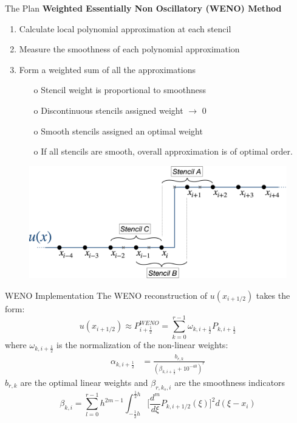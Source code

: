 \documentclass[10pt]{beamer}
\begin{document}
    \begin{frame}{The Plan}
      \textbf{Weighted Essentially Non Oscillatory (WENO) Method}
      \begin{enumerate}
        \item Calculate local polynomial approximation at each stencil
        \item Measure the smoothness of each polynomial approximation
        \item Form a weighted sum of all the approximations
            \begin{itemize}
              \item[o] Stencil weight is proportional to smoothness
              \item[o] Discontinuous stencils assigned weight $\rightarrow$ 0
              \item[o] Smooth stencils assigned an optimal weight 
              \item[o] If all stencils are smooth, overall approximation is of optimal order. 
            \end{itemize}
      \end{enumerate}


      \begin{figure}[H]
        \centering
        \includegraphics[scale=0.175]{DiscontinuousStencil.png}
        \end{figure}
    \end{frame}


\begin{frame}{WENO Implementation}
  The WENO reconstruction of $u(x_{i+1/2})$ takes the form:
  \begin{equation}
    u(x_{i+1/2})\approx P^{WENO}_{i+\frac{1}{2}}=\sum_{k=0}^{r-1}\omega_{k,i+\frac{1}{2}}P_{k,i+\frac{1}{2}}\label{eq:WenoEquation}
  \end{equation}
  where $\omega_{k,i+\frac{1}{2}}$ is the normalization of the non-linear weights:
  \begin{align}
    \alpha_{k,i+\frac{1}{2}}&=\frac{b_{r,k}}{(\beta_{k,i+\frac{1}{2}} +10^{-40})^r}
  \end{align}
  $b_{r,k}$ are the optimal linear weights and 
  $\beta_{r,k_s,i}$ are the smoothness indicators
  \begin{equation}
    \beta_{k,i} = \sum_{l=0}^{r-1}h^{2m-1}\int_{-\frac{1}{2}h}^{\frac{1}{2}h}\bigg[\frac{d^m}{d\xi}P_{k,i+1/2}(\xi)\bigg]^2d(\xi-x_i)\label{eq:OptimalCoefficients}
  \end{equation}
\end{frame}
\end{document}
